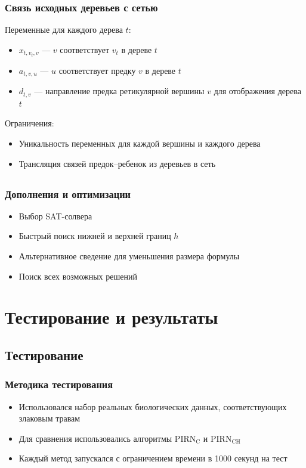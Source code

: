\documentclass[hyperref={unicode}]{beamer}
\begin{document}
\begin{frame}
\frametitle{Связь исходных деревьев с сетью}

Переменные для каждого дерева $t$:

\begin{itemize}
	\item $x_{t, v_t, v}$ --- $v$ соответствует $v_t$ в дереве $t$
	\item $a_{t, v, u}$ --- $u$ соответствует предку $v$ в дереве $t$
	\item $d_{t, v}$ --- направление предка ретикулярной вершины $v$ для отображения дерева $t$
\end{itemize}

Ограничения:
\begin{itemize}
	\item Уникальность переменных для каждой вершины и каждого дерева
	\item Трансляция связей предок--ребенок из деревьев в сеть
\end{itemize}

\end{frame}

\subsection{}

\begin{frame}
\frametitle{Дополнения и оптимизации}

\begin{itemize}
	\item Выбор SAT-солвера
	\item Быстрый поиск нижней и верхней границ $h$
	\item Альтернативное сведение для уменьшения размера формулы
	\item Поиск всех возможных решений
\end{itemize}

\end{frame}

\section{Тестирование и результаты}

\subsection{Тестирование}

\begin{frame}
\frametitle{Методика тестирования}

\begin{itemize}
	\item Использовался набор реальных биологических данных, соответствующих злаковым травам
	\item Для сравнения использовались алгоритмы $\mathrm{PIRN_C}$ и $\mathrm{PIRN_{CH}}$
	\item Каждый метод запускался с ограничением времени в 1000 секунд на тест
\end{itemize}

\end{frame}
\end{document}
